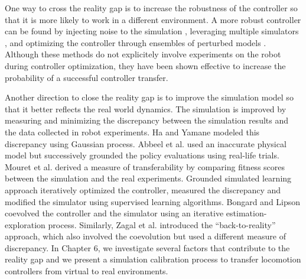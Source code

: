 One way to cross the reality gap is to increase the robustness of the controller so that it is more likely to work in a different environment. A more robust controller can be found by injecting noise to the simulation \cite{Miglino94,Jakobi95,Miglino96}, leveraging multiple simulators \cite{Boeing:2012}, and optimizing the controller through ensembles of perturbed models \cite{Mordatch:2015}. Although these methods do not explicitely involve experiments on the robot during controller optimization, they have been shown effective to increase the probability of a successful controller transfer.

Another direction to close the reality gap is to improve the simulation model so that it better reflects the real world dynamics. The simulation is improved by measuring and minimizing the discrepancy between the simulation results and the data collected in robot experiments. Ha and Yamane \cite{HA:2015} modeled this discrepancy using Gaussian process. Abbeel et al. \cite{Abbeel:2006} used an inaccurate physical model but successively grounded the policy evaluations using real-life trials. Mouret et al. \cite{MouretKD13, Koos:2010} derived a measure of transferability by comparing fitness scores between the simulation and the real experiments. Grounded simulated learning approach \cite{Farchy:2013} iteratively optimized the controller, measured the discrepancy and modified the simulator using supervised learning algorithms. Bongard and Lipson \cite{BongardL05} coevolved the controller and the simulator using an iterative estimation-exploration process. Similarly, Zagal et al. \cite{zagal2004} introduced the ``back-to-reality'' approach, which also involved the coevolution but used a different measure of discrepancy. In Chapter 6, we investigate several factors that contribute to the reality gap and we present a simulation calibration process to transfer locomotion controllers from virtual to real environments.
